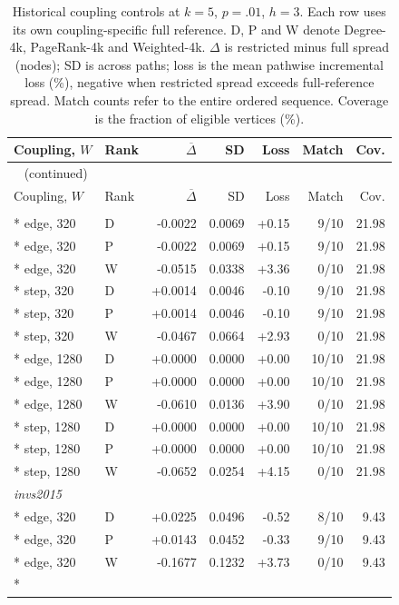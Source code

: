 \begin{longtable}{llrrrrr}
\caption{Historical coupling controls at $k=5$, $p=.01$, $h=3$. Each row uses its own coupling-specific full reference. D, P and W denote Degree-4k, PageRank-4k and Weighted-4k. $\Delta$ is restricted minus full spread (nodes); SD is across paths; loss is the mean pathwise incremental loss (\%), negative when restricted spread exceeds full-reference spread. Match counts refer to the entire ordered sequence. Coverage is the fraction of eligible vertices (\%).}\label{tab:hist-coupling}\\
\toprule
Coupling, $W$ & Rank & $\overline\Delta$ & SD & Loss & Match & Cov. \\
\midrule
\endfirsthead
\multicolumn{7}{l}{\tablename~\thetable{} (continued)}\\
\toprule
Coupling, $W$ & Rank & $\overline\Delta$ & SD & Loss & Match & Cov. \\
\midrule
\endhead
\bottomrule
\endfoot
\multicolumn{7}{l}{\textit{invs2013}}\\*
edge, 320 & D & -0.0022 & 0.0069 & +0.15 & 9/10 & 21.98\\*
edge, 320 & P & -0.0022 & 0.0069 & +0.15 & 9/10 & 21.98\\*
edge, 320 & W & -0.0515 & 0.0338 & +3.36 & 0/10 & 21.98\\*
step, 320 & D & +0.0014 & 0.0046 & -0.10 & 9/10 & 21.98\\*
step, 320 & P & +0.0014 & 0.0046 & -0.10 & 9/10 & 21.98\\*
step, 320 & W & -0.0467 & 0.0664 & +2.93 & 0/10 & 21.98\\*
edge, 1280 & D & +0.0000 & 0.0000 & +0.00 & 10/10 & 21.98\\*
edge, 1280 & P & +0.0000 & 0.0000 & +0.00 & 10/10 & 21.98\\*
edge, 1280 & W & -0.0610 & 0.0136 & +3.90 & 0/10 & 21.98\\*
step, 1280 & D & +0.0000 & 0.0000 & +0.00 & 10/10 & 21.98\\*
step, 1280 & P & +0.0000 & 0.0000 & +0.00 & 10/10 & 21.98\\*
step, 1280 & W & -0.0652 & 0.0254 & +4.15 & 0/10 & 21.98\\
\multicolumn{7}{l}{\textit{invs2015}}\\*
edge, 320 & D & +0.0225 & 0.0496 & -0.52 & 8/10 & 9.43\\*
edge, 320 & P & +0.0143 & 0.0452 & -0.33 & 9/10 & 9.43\\*
edge, 320 & W & -0.1677 & 0.1232 & +3.73 & 0/10 & 9.43\\*

\end{longtable}
